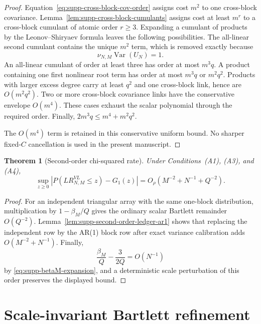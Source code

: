 \documentclass[12pt]{article}
\newtheorem{Theorem}[Proposition]{Theorem}
\theoremstyle{remark}
\begin{document}
\begin{proof}
Equation~\eqref{eq:supp-cross-block-cov-order} assigns cost $m^2$ to one cross-block covariance. Lemma~\ref{lem:supp-cross-block-cumulants} assigns cost at least $m^r$ to a cross-block cumulant of atomic order $r\ge3$. Expanding a cumulant of products by the Leonov--Shiryaev formula leaves the following possibilities. The all-linear second cumulant contains the unique $m^2$ term, which is removed exactly because
\[
\nu_{N,M}\operatorname{Var}(U_N)=1.
\]
An all-linear cumulant of order at least three has order at most $m^3q$. A product containing one first nonlinear root term has order at most $m^3q$ or $m^2q^2$. Products with larger excess degree carry at least $q^2$ and one cross-block link, hence are $O(m^2q^2)$. Two or more cross-block covariance links have the conservative envelope $O(m^4)$. These cases exhaust the scalar polynomial through the required order. Finally,
$2m^3q\le m^4+m^2q^2$.

The $O(m^4)$ term is retained in this conservative uniform bound. No sharper fixed-$C$ cancellation is used in the present manuscript.
\end{proof}

\begin{Theorem}[Second-order chi-squared rate]
\label{thm:supp-second-order-ar1}
Under Conditions~(A1), (A3), and (A4),
\begin{equation*}
\sup_{z\ge0}\left|P(LR^{VL}_{N,M}\le z)-G_1(z)\right|
=
O_\rho(M^{-2}+N^{-1}+Q^{-2}).
\end{equation*}
\end{Theorem}

\begin{proof}
For an independent triangular array with the same one-block distribution, multiplication by $1-\beta_M/Q$ gives the ordinary scalar Bartlett remainder $O(Q^{-2})$. Lemma~\ref{lem:supp-second-order-ledger-ar1} shows that replacing the independent row by the AR(1) block row after exact variance calibration adds
$O(M^{-2}+N^{-1})$. Finally,
\[
\frac{\beta_M}{Q}-\frac{3}{2Q}
=
O(N^{-1})
\]
by \eqref{eq:supp-betaM-expansion}, and a deterministic scale perturbation of this order preserves the displayed bound.
\end{proof}

\section{Scale-invariant Bartlett refinement}
\label{supp:Bartlett}
\end{document}
